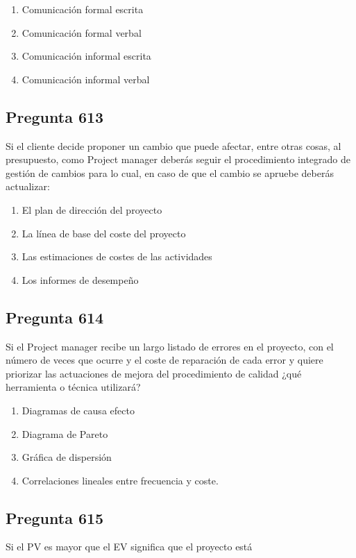 \documentclass[11pt,a4paper]{article}
\begin{document}
\begin{enumerate}[label=\alph*)]
  \item Comunicación formal escrita
  \item Comunicación formal verbal
  \item Comunicación informal escrita
  \item Comunicación informal verbal
\end{enumerate}

\subsection*{Pregunta 613}
Si el cliente decide proponer un cambio que puede afectar, entre otras cosas, al presupuesto, como Project manager deberás seguir el procedimiento integrado de gestión de cambios para lo cual, en caso de que el cambio se apruebe deberás actualizar:

\begin{enumerate}[label=\alph*)]
  \item El plan de dirección del proyecto
  \item La línea de base del coste del proyecto
  \item Las estimaciones de costes de las actividades
  \item Los informes de desempeño
\end{enumerate}

\subsection*{Pregunta 614}
Si el Project manager recibe un largo listado de errores en el proyecto, con el número de veces que ocurre y el coste de reparación de cada error y quiere priorizar las actuaciones de mejora del procedimiento de calidad ¿qué herramienta o técnica utilizará?

\begin{enumerate}[label=\alph*)]
  \item Diagramas de causa efecto
  \item Diagrama de Pareto
  \item Gráfica de dispersión
  \item Correlaciones lineales entre frecuencia y coste.
\end{enumerate}

\subsection*{Pregunta 615}
Si el PV es mayor que el EV significa que el proyecto está
\end{document}
